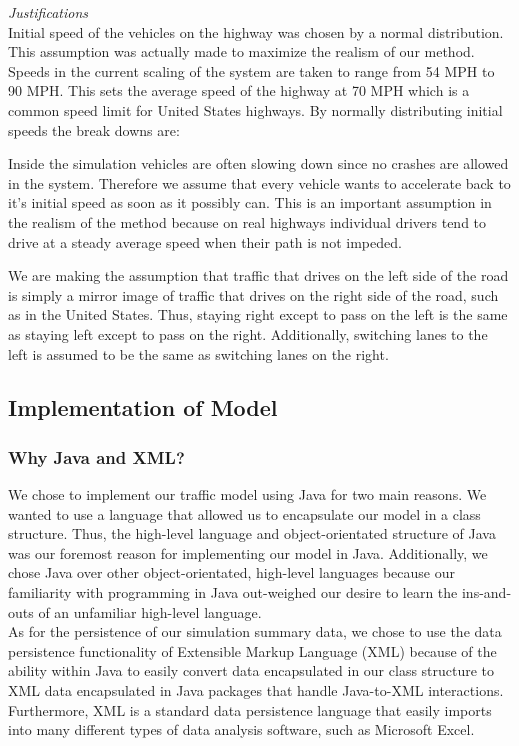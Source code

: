 \documentclass{amsart}
\begin{document}
\textit{Justifications}\\


	
	
	
	Initial speed of the vehicles on the highway was chosen by a normal distribution.  This assumption was actually made to maximize the realism of our method.  Speeds in the current scaling of the system are taken to range from 54 MPH to 90 MPH.  This sets the average speed of the highway at 70 MPH which is a common speed limit for United States highways.  By normally distributing initial speeds the break downs are:
	
	

	Inside the simulation vehicles are often slowing down since no crashes are allowed in the system.  Therefore we assume that every vehicle wants to accelerate back to it's initial speed as soon as it possibly can.  This is an important assumption in the realism of the method because on real highways individual drivers tend to drive at a steady average speed when their path is not impeded.  
	
	We are making the assumption that traffic that drives on the left side of the road is simply a mirror image of traffic that drives on the right side of the road, such as in the United States. Thus, staying right except to pass on the left is the same as staying left except to pass on the right. Additionally, switching lanes to the left is assumed to be the same as switching lanes on the right.
	
	

	
	\subsection{Implementation of Model}
	

		\subsubsection{Why Java and XML?}
			We chose to implement our traffic model using Java for two main reasons. We wanted to use a language that allowed us to encapsulate our model in a class structure. Thus, the high-level language and object-orientated structure of Java was our foremost reason for implementing our model in Java.  Additionally, we chose Java over other object-orientated, high-level languages because our familiarity with programming in Java out-weighed our desire to learn the ins-and-outs of an unfamiliar high-level language. \\
			As for the persistence of our simulation summary data, we chose to use the data persistence functionality of Extensible Markup Language (XML) because of the ability within Java to easily convert data encapsulated in our class structure to XML data encapsulated in Java packages that handle Java-to-XML interactions. Furthermore, XML is a standard data persistence language that easily imports into many different types of data analysis software, such as Microsoft Excel.  
\end{document}
